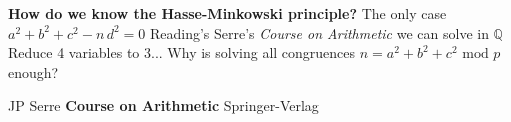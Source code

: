 \documentclass[12pt]{article}
\begin{document}
\newpage

\noindent\textbf{How do we know the Hasse-Minkowski principle?  }
\newline \newline
The only case $a^2 + b^2 + c^2 - n \, d^2 = 0$ 
\newline \newline
Reading's Serre's \textit{Course on Arithmetic} we can solve in $\mathbb{Q}$
\newline \newline
Reduce 4 variables to 3...
\newline \newline
Why is solving all congruences $n = a^2 + b^2 + c^2 \textrm{ mod }p$ enough?

\newpage

\selectfont \fontsize{12}{10}\selectfont

\begin{thebibliography}{}

\item JP Serre \textbf{Course on Arithmetic} Springer-Verlag



\end{thebibliography}
\end{document}
